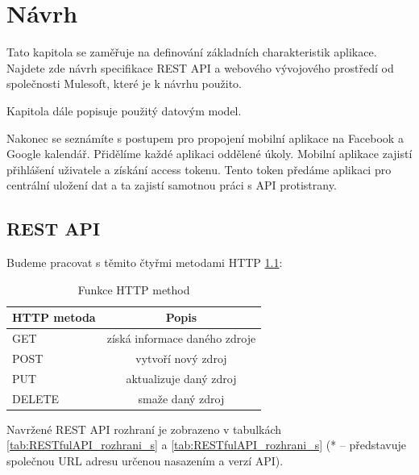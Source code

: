 \documentclass[thesis=B,czech]{FITthesis}[2012/06/26]
\begin{document}
\chapter{Návrh}

Tato kapitola se zaměřuje na definování základních charakteristik aplikace. Najdete zde návrh specifikace REST API a webového vývojového prostředí od společnosti Mulesoft, které je k návrhu použito. 

Kapitola dále popisuje použitý datovým model.

Nakonec se seznámíte s postupem pro propojení mobilní aplikace na Facebook a Google kalendář. Přidělíme každé aplikaci oddělené úkoly. Mobilní aplikace zajistí přihlášení uživatele a získání access tokenu. Tento token předáme aplikaci pro centrální uložení dat a ta zajistí samotnou práci s API protistrany.

\section{REST API}
\label{rest_api_design}

Budeme pracovat s těmito čtyřmi metodami HTTP \ref{tab:RESTfulAPI_definice}:

\begin{table}[!h]\centering
\caption{Funkce HTTP method}\label{tab:RESTfulAPI_definice}
	\begin{tabular}{l c}
		\toprule
		\textbf{HTTP metoda} & \textbf{Popis} \\ \midrule \midrule
		GET & získá informace daného zdroje  \\ \midrule	
		POST & vytvoří nový zdroj\\ \midrule
		PUT & aktualizuje daný zdroj  \\ \midrule
		DELETE & smaže daný zdroj \\ \bottomrule
	\end{tabular}
\end{table}

Navržené REST API rozhraní je zobrazeno v tabulkách \ref{tab:RESTfulAPI_rozhrani_s} a \ref{tab:RESTfulAPI_rozhrani_s} (* -- představuje společnou URL adresu určenou nasazením a verzí API).
\end{document}
